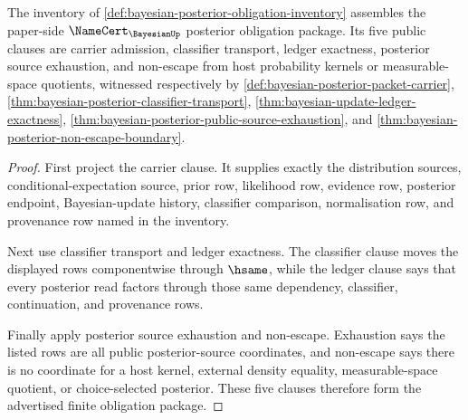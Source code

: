 \begin{theorem}
\label{thm:bayesian-posterior-obligation-package}
The inventory of \autoref{def:bayesian-posterior-obligation-inventory} assembles the paper-side $\NameCert_{\BayesianUp}$ posterior obligation package. Its five public clauses are carrier admission, classifier transport, ledger exactness, posterior source exhaustion, and non-escape from host probability kernels or measurable-space quotients, witnessed respectively by \autoref{def:bayesian-posterior-packet-carrier}, \autoref{thm:bayesian-posterior-classifier-transport}, \autoref{thm:bayesian-update-ledger-exactness}, \autoref{thm:bayesian-posterior-public-source-exhaustion}, and \autoref{thm:bayesian-posterior-non-escape-boundary}.
\end{theorem}
\begin{proof}
First project the carrier clause. It supplies exactly the distribution sources, conditional-expectation source, prior row, likelihood row, evidence row, posterior endpoint, Bayesian-update history, classifier comparison, normalisation row, and provenance row named in the inventory.

Next use classifier transport and ledger exactness. The classifier clause moves the displayed rows componentwise through $\hsame$, while the ledger clause says that every posterior read factors through those same dependency, classifier, continuation, and provenance rows.

Finally apply posterior source exhaustion and non-escape. Exhaustion says the listed rows are all public posterior-source coordinates, and non-escape says there is no coordinate for a host kernel, external density equality, measurable-space quotient, or choice-selected posterior. These five clauses therefore form the advertised finite obligation package.
\end{proof}


